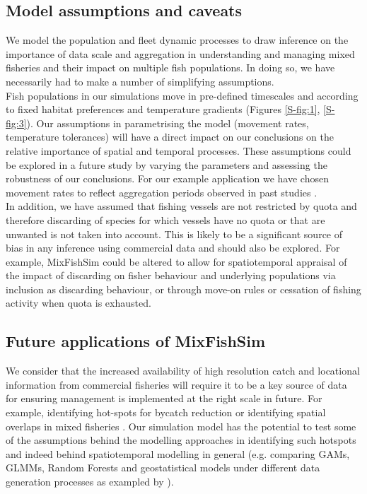 \documentclass[review]{elsarticle}
\begin{document}
\subsection{Model assumptions and caveats}

We model the population and fleet dynamic processes to draw inference on the
importance of data scale and aggregation in understanding and managing mixed
fisheries and their impact on multiple fish populations. In doing so, we have
necessarily had to make a number of simplifying assumptions. \\

Fish populations in our simulations move in pre-defined timescales and
according to fixed habitat preferences and temperature gradients (Figures
\ref{S-fig:1}, \ref{S-fig:3}). Our assumptions in parametrising the model
(movement rates, temperature tolerances) will have a direct impact on our
conclusions on the relative importance of spatial and temporal processes. These
assumptions could be explored in a future study by varying the parameters and
assessing the robustness of our conclusions. For our example application we
have chosen movement rates to reflect aggregation periods observed in past
studies \citep{Poos2007}. \\

In addition, we have assumed that fishing vessels are not restricted by quota
and therefore discarding of species for which vessels have no quota or that are
unwanted is not taken into account. This is likely to be a significant source
of bias in any inference using commercial data and should also be explored. For
example, MixFishSim could be altered to allow for spatiotemporal appraisal of
the impact of discarding on fisher behaviour and underlying populations via
inclusion as discarding behaviour, or through move-on rules or cessation of
fishing activity when quota is exhausted. \\

\subsection{Future applications of MixFishSim}

We consider that the increased availability of high resolution catch and
locational information from commercial fisheries will require it to be a key
source of data for ensuring management is implemented at the right scale in
future. For example, identifying hot-spots for bycatch reduction or identifying
spatial overlaps in mixed fisheries \citep{Dolder2018, Gardner2008, Little2014,
	Dedman2015, Ward2015}. Our simulation model has the potential to test
some of the assumptions behind the modelling approaches in identifying such
hotspots and indeed behind spatiotemporal modelling in general (e.g. comparing
GAMs, GLMMs, Random Forests and geostatistical models under different data
generation processes as exampled by \cite{Stock2019}). \\
\end{document}
